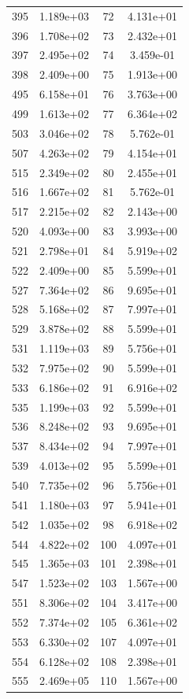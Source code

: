 \documentclass[12pt]{article}
\begin{document}
\begin{longtable}{@{}cccc@{}}
395 & 1.189e+03 & 72 & 4.131e+01 \\
396 & 1.708e+02 & 73 & 2.432e+01 \\
397 & 2.495e+02 & 74 & 3.459e-01 \\
398 & 2.409e+00 & 75 & 1.913e+00 \\
495 & 6.158e+01 & 76 & 3.763e+00 \\
499 & 1.613e+02 & 77 & 6.364e+02 \\
503 & 3.046e+02 & 78 & 5.762e-01 \\
507 & 4.263e+02 & 79 & 4.154e+01 \\
515 & 2.349e+02 & 80 & 2.455e+01 \\
516 & 1.667e+02 & 81 & 5.762e-01 \\
517 & 2.215e+02 & 82 & 2.143e+00 \\
520 & 4.093e+00 & 83 & 3.993e+00 \\
521 & 2.798e+01 & 84 & 5.919e+02 \\
522 & 2.409e+00 & 85 & 5.599e+01 \\
527 & 7.364e+02 & 86 & 9.695e+01 \\
528 & 5.168e+02 & 87 & 7.997e+01 \\
529 & 3.878e+02 & 88 & 5.599e+01 \\
531 & 1.119e+03 & 89 & 5.756e+01 \\
532 & 7.975e+02 & 90 & 5.599e+01 \\
533 & 6.186e+02 & 91 & 6.916e+02 \\
535 & 1.199e+03 & 92 & 5.599e+01 \\
536 & 8.248e+02 & 93 & 9.695e+01 \\
537 & 8.434e+02 & 94 & 7.997e+01 \\
539 & 4.013e+02 & 95 & 5.599e+01 \\
540 & 7.735e+02 & 96 & 5.756e+01 \\
541 & 1.180e+03 & 97 & 5.941e+01 \\
542 & 1.035e+02 & 98 & 6.918e+02 \\
544 & 4.822e+02 & 100 & 4.097e+01 \\
545 & 1.365e+03 & 101 & 2.398e+01 \\
547 & 1.523e+02 & 103 & 1.567e+00 \\
551 & 8.306e+02 & 104 & 3.417e+00 \\
552 & 7.374e+02 & 105 & 6.361e+02 \\
553 & 6.330e+02 & 107 & 4.097e+01 \\
554 & 6.128e+02 & 108 & 2.398e+01 \\
555 & 2.469e+05 & 110 & 1.567e+00 \\

\end{longtable}
\end{document}
